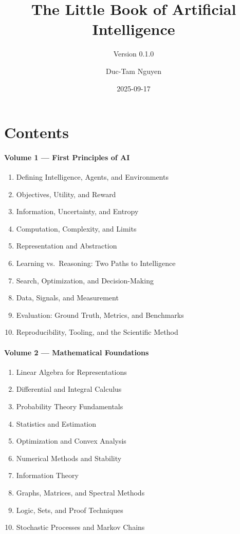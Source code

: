 \documentclass[
  letterpaper,
  DIV=11,
  numbers=noendperiod]{scrreprt}
\title{The Little Book of Artificial Intelligence}
\subtitle{Version 0.1.0}
\author{Duc-Tam Nguyen}
\date{2025-09-17}
\providecommand{\tightlist}{%
  \setlength{\itemsep}{0pt}\setlength{\parskip}{0pt}}
\renewcommand*\contentsname{Table of contents}
\newcommand\contentsname{Table of contents}
\begin{document}
\maketitle

\renewcommand*\contentsname{Table of contents}
{
\hypersetup{linkcolor=}
\setcounter{tocdepth}{2}
\tableofcontents
}


\chapter{Contents}\label{contents}

\subsubsection{Volume 1 --- First Principles of
AI}\label{volume-1-first-principles-of-ai}

\begin{enumerate}
\def\labelenumi{\arabic{enumi}.}
\tightlist
\item
  Defining Intelligence, Agents, and Environments
\item
  Objectives, Utility, and Reward
\item
  Information, Uncertainty, and Entropy
\item
  Computation, Complexity, and Limits
\item
  Representation and Abstraction
\item
  Learning vs.~Reasoning: Two Paths to Intelligence
\item
  Search, Optimization, and Decision-Making
\item
  Data, Signals, and Measurement
\item
  Evaluation: Ground Truth, Metrics, and Benchmarks
\item
  Reproducibility, Tooling, and the Scientific Method
\end{enumerate}

\subsubsection{Volume 2 --- Mathematical
Foundations}\label{volume-2-mathematical-foundations}

\begin{enumerate}
\def\labelenumi{\arabic{enumi}.}
\setcounter{enumi}{10}
\tightlist
\item
  Linear Algebra for Representations
\item
  Differential and Integral Calculus
\item
  Probability Theory Fundamentals
\item
  Statistics and Estimation
\item
  Optimization and Convex Analysis
\item
  Numerical Methods and Stability
\item
  Information Theory
\item
  Graphs, Matrices, and Spectral Methods
\item
  Logic, Sets, and Proof Techniques
\item
  Stochastic Processes and Markov Chains
\end{enumerate}
\end{document}

